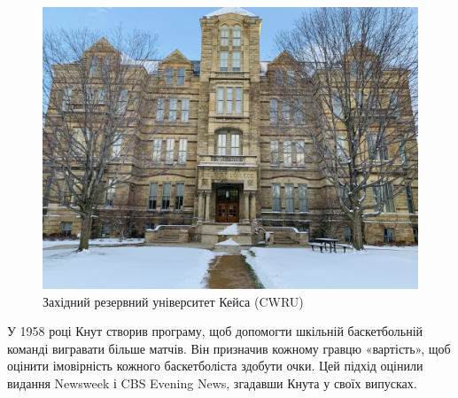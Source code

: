 \documentclass{article}
\begin{document}
\begin{figure}[ht]
    \centering
    \begin{minipage}{0.5\textwidth}
        \centering
        \includegraphics[width=\linewidth]{CWRU.jpg}
    \end{minipage}
    \hspace{0.5cm}
    \begin{minipage}{0.4\textwidth}
        \raggedright 
        \caption{Західний резервний університет Кейса (CWRU)}
        \label{fig:cwru}
    \end{minipage}
\end{figure}

У 1958 році Кнут створив програму, щоб допомогти шкільній баскетбольній команді вигравати більше матчів. Він призначив кожному гравцю «вартість», щоб оцінити імовірність кожного баскетболіста здобути очки. Цей підхід оцінили видання Newsweek і CBS Evening News, згадавши Кнута у своїх випусках.
\end{document}
